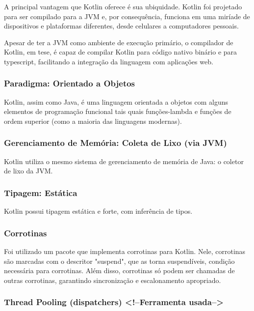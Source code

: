 \documentclass[12pt,a4paper]{article}
\begin{document}
A principal vantagem que Kotlin oferece é sua ubiquidade. Kotlin foi projetado para ser compilado para a JVM e, por consequência, funciona em uma miríade de dispositivos e plataformas diferentes, desde celulares a computadores pessoais.

Apesar de ter a JVM como ambiente de execução primário, o compilador de Kotlin, em tese, é capaz de compilar Kotlin para código nativo binário e para typescript, facilitando a integração da linguagem com aplicações web.

\subsubsection{Paradigma: Orientado a Objetos}
\label{sssec:kotlin paradigma}

Kotlin, assim como Java, é uma linguagem orientada a objetos com alguns elementos de programação funcional tais quais funções-lambda e funções de ordem superior (como a maioria das linguagens modernas).

\subsubsection{Gerenciamento de Memória: Coleta de Lixo (via JVM)}
\label{sssec:kotlin memoria}

Kotlin utiliza o mesmo sistema de gerenciamento de memória de Java: o coletor de lixo da JVM.

\subsubsection{Tipagem: Estática}
\label{sssec:kotlin tipagem}

Kotlin possui tipagem estática e forte, com inferência de tipos.

\subsubsection{Corrotinas}
\label{sssec:kotlin corrotinas}

Foi utilizado um pacote que implementa corrotinas para Kotlin. Nele, corrotinas são marcadas com o descritor "suspend", que as torna suspendíveis, condição necessária para corrotinas. Além disso, corrotinas só podem ser chamadas de outras corrotinas, garantindo sincronização e escalonamento apropriado.

\subsubsection{Thread Pooling (dispatchers) <!--Ferramenta usada-->}
\label{sssec:kotlin thread pooling}
\end{document}
